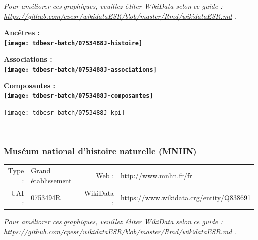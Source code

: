 \documentclass[12pt,french,]{article}
\begin{document}
\textit{\scriptsize Pour améliorer ces graphiques, veuillez éditer WikiData selon ce guide :  \href{https://github.com/cpesr/wikidataESR/blob/master/Rmd/wikidataESR.md}{https://github.com/cpesr/wikidataESR/blob/master/Rmd/wikidataESR.md}}
.

\vspace{1cm}  
\begin{minipage}[b]{0.50\textwidth}\begin{center} \bf Ancêtres : \\  
\texttt{[image: tdbesr-batch/0753488J-histoire]} \end{center}\end{minipage}\begin{minipage}[b]{0.50\textwidth}\begin{center} \bf Associations : \\  
\texttt{[image: tdbesr-batch/0753488J-associations]} \end{center}\end{minipage}

\hrulefill

\begin{center} \bf Composantes : \\  
\texttt{[image: tdbesr-batch/0753488J-composantes]} \end{center}

\begin{center}\texttt{[image: tdbesr-batch/0753488J-kpi]} \end{center}\checkoddpage

\ifoddpage \fi ~\newpage  

\hypertarget{musuxe9um-national-dhistoire-naturelle-mnhn}{%
\subsubsection{Muséum national d'histoire naturelle
(MNHN)}\label{musuxe9um-national-dhistoire-naturelle-mnhn}}

\begin{tabular*}{\textwidth}{rp{5cm}rl}  
\hline  
Type : & Grand établissement & Web : &\href{http://www.mnhn.fr/fr}{http://www.mnhn.fr/fr} \\  
UAI : & 0753494R & WikiData : & \href{https://www.wikidata.org/entity/Q838691}{https://www.wikidata.org/entity/Q838691} \\  
\hline  
\end{tabular*}

\textit{\scriptsize Pour améliorer ces graphiques, veuillez éditer WikiData selon ce guide :  \href{https://github.com/cpesr/wikidataESR/blob/master/Rmd/wikidataESR.md}{https://github.com/cpesr/wikidataESR/blob/master/Rmd/wikidataESR.md}}
.
\end{document}
